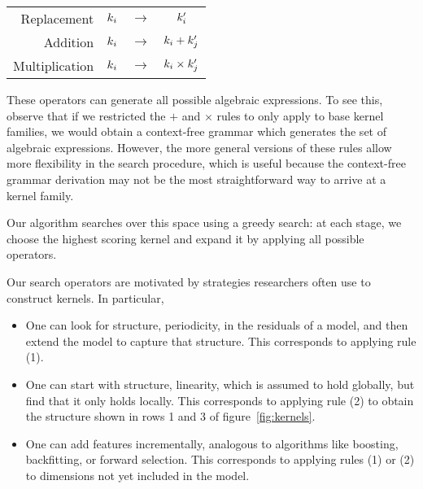 \begin{center}
\begin{tabular}{rccc}
\textrm{Replacement} & $k_i$ & $\to$ & $k'_i$\\%
\textrm{Addition} & $k_i$ & $\to$ & $k_i + k'_j$\\%
\textrm{Multiplication} & $k_i$ &  $\to$ & $k_i \times k'_j$\\%
\end{tabular}
\end{center}

These operators can generate all possible algebraic expressions.
To see this, observe that if we restricted the $+$ and $\times$ rules to only apply to base kernel families, we would obtain a context-free grammar which generates the set of algebraic expressions.
However, the more general versions of these rules allow more flexibility in the search procedure, which is useful because the context-free grammar derivation may not be the most straightforward way to arrive at a kernel family.

Our algorithm searches over this space using a greedy search: at each stage, we choose the highest scoring kernel and expand it by applying all possible operators.

Our search operators are motivated by strategies researchers often use to construct kernels.
In particular,
\begin{itemize}
\item One can look for structure, \eg periodicity, in the residuals of a model, and then extend the model to capture that structure.
This corresponds to applying rule (1).
\item One can start with structure, \eg linearity, which is assumed to hold globally, but find that it only holds locally.
This corresponds to applying rule (2) to obtain the structure shown in rows 1 and 3 of figure~\ref{fig:kernels}.
\item One can add features incrementally, analogous to algorithms like boosting, backfitting, or forward selection.
This corresponds to applying rules (1) or (2) to dimensions not yet included in the model.
\end{itemize}


